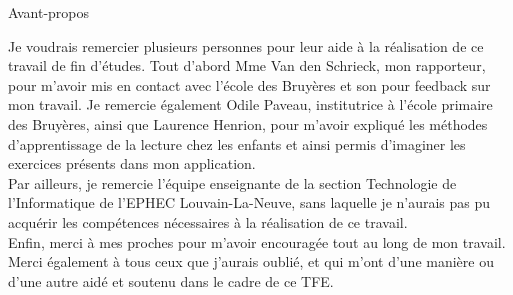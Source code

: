 \begin{center}
\begin{minipage}{0.8\textwidth}
\begin{center}
\large Avant-propos
\end{center}
Je voudrais remercier plusieurs personnes pour leur aide à la réalisation de ce travail de fin d'études. Tout d'abord Mme Van den Schrieck, mon rapporteur, pour m'avoir mis en contact avec l'école des Bruyères et son pour feedback sur mon travail. Je remercie également Odile Paveau, institutrice à l'école primaire des Bruyères, ainsi que Laurence Henrion, pour m'avoir expliqué les méthodes d'apprentissage de la lecture chez les enfants et ainsi permis d'imaginer les exercices présents dans mon application.\\

Par ailleurs, je remercie l'équipe enseignante de la section Technologie de l'Informatique de l'EPHEC Louvain-La-Neuve, sans laquelle je n'aurais pas pu acquérir les compétences nécessaires à la réalisation de ce travail.\\

Enfin, merci à mes proches pour m'avoir encouragée tout au long de mon travail. Merci également à tous ceux que j'aurais oublié, et qui m'ont d'une manière ou d'une autre aidé et soutenu dans le cadre de ce TFE.
\end{minipage}
\end{center}
